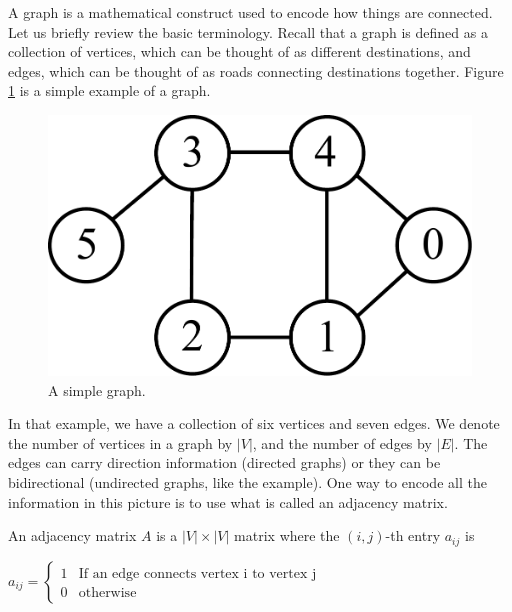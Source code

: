 

A graph is a mathematical construct used to encode how things are connected. Let us briefly review the basic terminology.
Recall that a graph is defined as a collection of vertices, which can be thought of as different destinations, and edges, which can be thought of as roads connecting destinations together.
Figure \ref{segmentation:graph} is a simple example of a graph.

\begin{figure}
\includegraphics[scale=0.4]{graphExample}
\caption{A simple graph.}
\label{segmentation:graph}
\end{figure}

In that example, we have a collection of six vertices and seven edges.
We denote the number of vertices in a graph by $|V|$, and the number of edges by $|E|$.
The edges can carry direction information (directed graphs) or they can be bidirectional (undirected graphs, like the example).
One way to encode all the information in this picture is to use what is called an adjacency matrix.

\begin{definition} An adjacency matrix $A$ is a $|V| \times |V|$ matrix where the $(i,j)$-th entry $a_{ij}$ is
\begin{center}
	$a_{ij} = \begin{cases} 1 & \mbox{If an edge connects vertex i to vertex j} \\ 0 & \mbox{otherwise} \end{cases}$
\end{center}
\end{definition}

